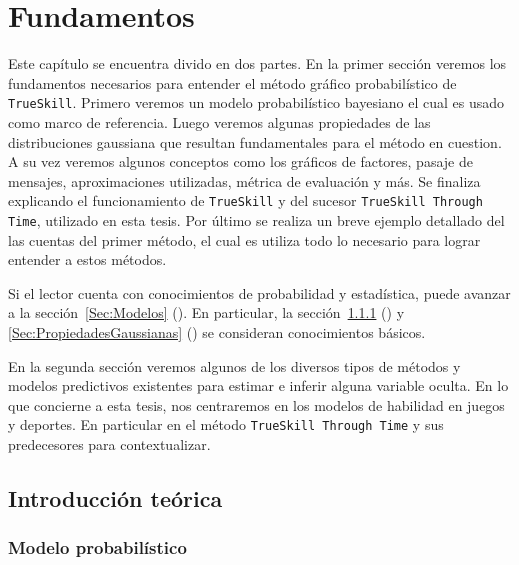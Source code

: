 \documentclass[11pt,twoside,spanish]{report} %
\begin{document}
\chapter{Fundamentos}



Este cap\'itulo se encuentra divido en dos partes.
En la primer secci\'on veremos los fundamentos necesarios para entender el m\'etodo gr\'afico probabil\'istico de \texttt{TrueSkill}.
Primero veremos un modelo probabil\'istico bayesiano el cual es usado como marco de referencia.
Luego veremos algunas propiedades de las distribuciones gaussiana que resultan fundamentales para el m\'etodo en cuestion.
A su vez veremos algunos conceptos como los gr\'aficos de factores, pasaje de mensajes, aproximaciones utilizadas, m\'etrica de evaluaci\'on y m\'as.
Se finaliza explicando el funcionamiento de \texttt{TrueSkill} y del sucesor \texttt{TrueSkill Through Time}, utilizado en esta tesis.
Por \'ultimo se realiza un breve ejemplo detallado del las cuentas del primer m\'etodo, el cual es utiliza todo lo necesario para lograr entender a estos m\'etodos.


Si el lector cuenta con conocimientos de probabilidad y estad\'istica, puede avanzar a la secci\'on~\ref{Sec:Modelos} ().
En particular, la secci\'on~\ref{Sec:ModeloProbalistico} () y \ref{Sec:PropiedadesGaussianas} () se consideran conocimientos b\'asicos.


En la segunda secci\'on veremos algunos de los diversos tipos de m\'etodos y modelos predictivos existentes para estimar e inferir alguna variable oculta.
En lo que concierne a esta tesis, nos centraremos en los modelos de habilidad en juegos y deportes.
En particular en el m\'etodo \texttt{TrueSkill Through Time} y sus predecesores para contextualizar.

\section{Introducci\'on te\'orica}



\subsection{Modelo probabil\'istico}\label{Sec:ModeloProbalistico}
\end{document}
